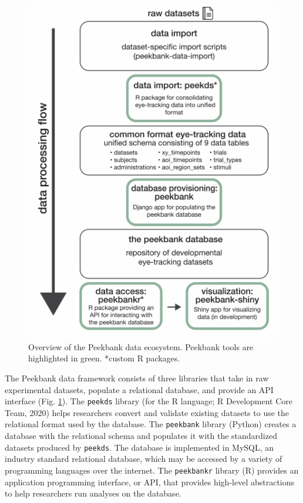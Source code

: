 \documentclass[10pt, letterpaper]{article}
\newenvironment{CodeChunk}{}{}
\begin{document}
\begin{CodeChunk}
\begin{figure}[tb]

{\centering \includegraphics{figs/fig_framework_overview-1} 

}

\caption[Overview of the Peekbank data ecosystem]{Overview of the Peekbank data ecosystem. Peekbank tools are highlighted in green. *custom R packages.}\label{fig:fig_framework_overview}
\end{figure}
\end{CodeChunk}

The Peekbank data framework consists of three libraries that take in raw
experimental datasets, populate a relational database, and provide an
API interface (Fig. \ref{fig:fig_framework_overview}). The
\texttt{peekds} library (for the R language; R Development Core Team,
2020) helps researchers convert and validate existing datasets to use
the relational format used by the database. The \texttt{peekbank}
library (Python) creates a database with the relational schema and
populates it with the standardized datasets produced by \texttt{peekds}.
The database is implemented in MySQL, an industry standard relational
database, which may be accessed by a variety of programming languages
over the internet. The \texttt{peekbankr} library (R) provides an
application programming interface, or API, that provides high-level
abstractions to help researchers run analyses on the database.
\end{document}

